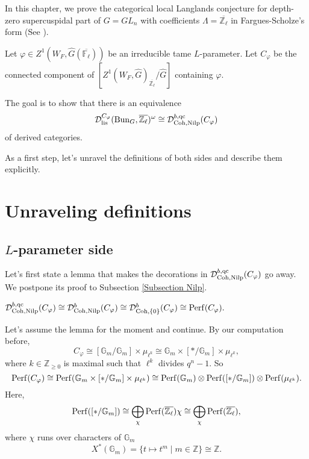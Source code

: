 In this chapter, we prove the categorical local Langlands conjecture for depth-zero supercuspidal part of $G=GL_n$ with coefficients $\Lambda=\overline{\mathbb{Z}_{\ell}}$ in Fargues-Scholze's form (See \cite[Conjecture X.3.5]{fargues2021geometrization}).

Let $\varphi \in Z^1(W_F, \hat{G}(\overline{\mathbb{F}_{\ell}}))$ be an irreducible tame $L$-parameter. Let $C_{\varphi}$ be the connected component of $[Z^1(W_F, \hat{G})_{\overline{\mathbb{Z}_{\ell}}}/\hat{G}]$ containing $\varphi$. 

The goal is to show that there is an equivalence
$$\mathcal{D}_{\operatorname{\operatorname{lis}}}^{C_{\varphi}}(\operatorname{\operatorname{Bun}}_G, \overline{\mathbb{Z}_{\ell}})^{\omega} \cong \mathcal{D}^{b, \operatorname{\operatorname{qc}}}_{\operatorname{\operatorname{Coh}}, \operatorname{\operatorname{Nilp}}}(C_{\varphi})$$
of derived categories.

As a first step, let's unravel the definitions of both sides and describe them explicitly.

\section{Unraveling definitions}

\subsection{$L$-parameter side}

Let's first state a lemma that makes the decorations in $\mathcal{D}^{b, \operatorname{\operatorname{qc}}}_{\operatorname{\operatorname{Coh}}, \operatorname{\operatorname{Nilp}}}(C_{\varphi})$ go away. We postpone its proof to Subsection \ref{Subsection Nilp}.

\begin{lemma} \label{Lemma 1}
	$\mathcal{D}^{b, \operatorname{\operatorname{qc}}}_{\operatorname{\operatorname{Coh}}, \operatorname{\operatorname{Nilp}}}(C_{\varphi}) \cong \mathcal{D}^{b}_{\operatorname{\operatorname{Coh}}, \operatorname{\operatorname{Nilp}}}(C_{\varphi}) \cong \mathcal{D}^b_{\operatorname{\operatorname{Coh}}, \{0\}}(C_{\varphi}) \cong \operatorname{\operatorname{Perf}}(C_{\varphi}).$
\end{lemma} 
	
Let's assume the lemma for the moment and continue. By our computation before,
$$C_{\varphi} \cong [\mathbb{G}_m/\mathbb{G}_m] \times \mu_{\ell^k} \cong \mathbb{G}_m \times [*/\mathbb{G}_m] \times \mu_{\ell^k},$$
where $k \in \mathbb{Z}_{\geq 0}$ is maximal such that $\ell^k$ divides $q^n-1$. So
$$\operatorname{\operatorname{Perf}}(C_{\varphi}) \cong \operatorname{\operatorname{Perf}}(\mathbb{G}_m \times [*/\mathbb{G}_m] \times \mu_{\ell^k}) \cong \operatorname{\operatorname{Perf}}(\mathbb{G}_m) \otimes \operatorname{\operatorname{Perf}}([*/\mathbb{G}_m]) \otimes \operatorname{\operatorname{Perf}}(\mu_{\ell^k}).$$
Here,
$$\operatorname{\operatorname{Perf}}([*/\mathbb{G}_m]) \cong \bigoplus_{\chi}\operatorname{\operatorname{Perf}}(\overline{\mathbb{Z}_{\ell}})\chi \cong \bigoplus_{\chi}\operatorname{\operatorname{Perf}}(\overline{\mathbb{Z}_{\ell}}),$$
where $\chi$ runs over characters of $\mathbb{G}_m$ 
$$X^*(\mathbb{G}_m)=\{t \mapsto t^m \;|\; m \in \mathbb{Z}\} \cong \mathbb{Z}.$$

